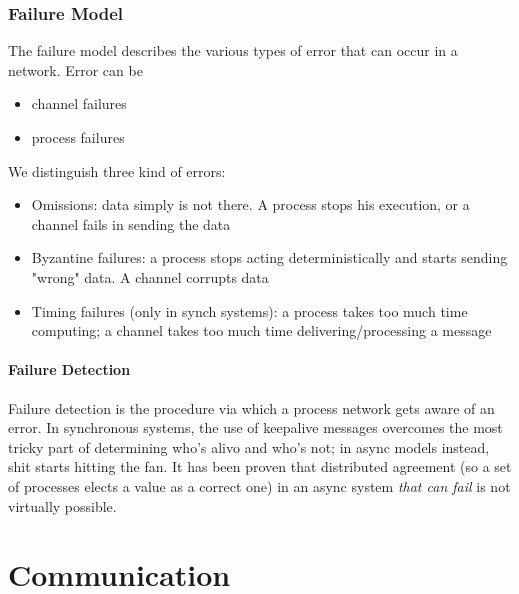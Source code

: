 \documentclass[10pt,a4paper]{article}
\begin{document}
		\section{Failure Model}
			The failure model describes the various types of error that can occur in a network. Error can be
			\begin{itemize}
				\item channel failures
				\item process failures
			\end{itemize}
			We distinguish three kind of errors:
			\begin{itemize}
				\item Omissions: data simply is not there. A process stops his execution, or a channel fails in sending the data
				\item Byzantine failures: a process stops acting deterministically and starts sending "wrong" data. A channel corrupts data
				\item Timing failures (only in synch systems): a process takes too much time computing; a channel takes too much time delivering/processing a message
			\end{itemize}
			
			\subsection{Failure Detection}
				Failure detection is the procedure via which a process network gets aware of an error. In synchronous systems, the use of keepalive messages overcomes the most tricky part of determining who's alivo and who's not; in async models instead, shit starts hitting the fan. It has been proven that distributed agreement (so a set of processes elects a value as a correct one) in an async system \emph{that can fail} is not virtually possible. 
				
	\part{Communication}
\end{document}
